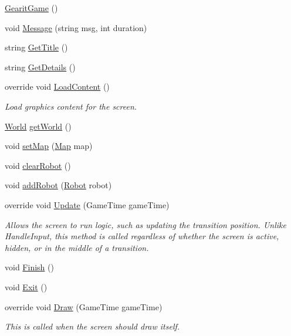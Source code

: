 \begin{DoxyCompactItemize}
\item 
\hyperlink{classgearit_1_1src_1_1game_1_1_gearit_game_a852044dce585ab78357c008df09358af}{Gearit\+Game} ()
\item 
void \hyperlink{classgearit_1_1src_1_1game_1_1_gearit_game_a28b0c521c4aabebf1ffd371584b5d9cb}{Message} (string msg, int duration)
\item 
string \hyperlink{classgearit_1_1src_1_1game_1_1_gearit_game_a4047d54db7ed3d548f063f8314958186}{Get\+Title} ()
\item 
string \hyperlink{classgearit_1_1src_1_1game_1_1_gearit_game_aa2b58b45dd7111e2b5a3d0c4fcdaab29}{Get\+Details} ()
\item 
override void \hyperlink{classgearit_1_1src_1_1game_1_1_gearit_game_a594a34785135e198e7fdc4e7280d5508}{Load\+Content} ()
\begin{DoxyCompactList}\small\item\em Load graphics content for the screen. \end{DoxyCompactList}\item 
\hyperlink{class_farseer_physics_1_1_dynamics_1_1_world}{World} \hyperlink{classgearit_1_1src_1_1game_1_1_gearit_game_a12bb37005bb4ee22fb58e975c4c2b10d}{get\+World} ()
\item 
void \hyperlink{classgearit_1_1src_1_1game_1_1_gearit_game_aba6ce1a8471336e5b674101c81345243}{set\+Map} (\hyperlink{classgearit_1_1src_1_1map_1_1_map}{Map} map)
\item 
void \hyperlink{classgearit_1_1src_1_1game_1_1_gearit_game_acb77b34645e1a3edafb0bdb6329a5d33}{clear\+Robot} ()
\item 
void \hyperlink{classgearit_1_1src_1_1game_1_1_gearit_game_a7899ec712a4d177319c5295f09257cea}{add\+Robot} (\hyperlink{classgearit_1_1src_1_1robot_1_1_robot}{Robot} robot)
\item 
override void \hyperlink{classgearit_1_1src_1_1game_1_1_gearit_game_a3ff28ebe6aaf734eaaf28126a976024f}{Update} (Game\+Time game\+Time)
\begin{DoxyCompactList}\small\item\em Allows the screen to run logic, such as updating the transition position. Unlike Handle\+Input, this method is called regardless of whether the screen is active, hidden, or in the middle of a transition. \end{DoxyCompactList}\item 
void \hyperlink{classgearit_1_1src_1_1game_1_1_gearit_game_a2ac6b373bb1f8648be88104c33e582fc}{Finish} ()
\item 
void \hyperlink{classgearit_1_1src_1_1game_1_1_gearit_game_aa5a9a1d5fb16f121ab612737ab55fbec}{Exit} ()
\item 
override void \hyperlink{classgearit_1_1src_1_1game_1_1_gearit_game_a8a184898f8f48c32f5c811721d86e2de}{Draw} (Game\+Time game\+Time)
\begin{DoxyCompactList}\small\item\em This is called when the screen should draw itself. \end{DoxyCompactList}\end{DoxyCompactItemize}
